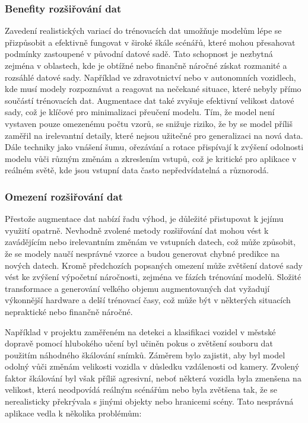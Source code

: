 \documentclass[male,czech,api_ing]{thesis}
\begin{document}
\subsubsection{Benefity rozšiřování dat}
Zavedení realistických variací do trénovacích dat umožňuje modelům lépe se přizpůsobit a efektivně fungovat v široké škále scénářů, které mohou přesahovat podmínky zastoupené v původní datové sadě. Tato schopnost je nezbytná zejména v oblastech, kde je obtížné nebo finančně náročné získat rozmanité a rozsáhlé datové sady. Například ve zdravotnictví nebo v autonomních vozidlech, kde musí modely rozpoznávat a reagovat na nečekané situace, které nebyly přímo součástí trénovacích dat. Augmentace dat také zvyšuje efektivní velikost datové sady, což je klíčové pro minimalizaci přeučení modelu. Tím, že model není vystaven pouze omezenému počtu vzorů, se snižuje riziko, že by se model příliš zaměřil na irelevantní detaily, které nejsou užitečné pro generalizaci na nová data. Dále techniky jako vnášení šumu, ořezávání a rotace přispívají k zvýšení odolnosti modelu vůči různým změnám a zkreslením vstupů, což je kritické pro aplikace v reálném světě, kde jsou vstupní data často nepředvídatelná a různorodá. \cite{AugmentationBasics, AugmentationSurvey}

\subsubsection{Omezení rozšiřování dat}
Přestože augmentace dat nabízí řadu výhod, je důležité přistupovat k jejímu využití opatrně. Nevhodně zvolené metody rozšiřování dat mohou vést k zavádějícím nebo irelevantním změnám ve vstupních datech, což může způsobit, že se modely naučí nesprávné vzorce a budou generovat chybné predikce na nových datech. Kromě předchozích popsaných omezení může zvětšení datové sady vést ke zvýšení výpočetní náročnosti, zejména ve fázích trénování modelů. Složité transformace a generování velkého objemu augmentovaných dat vyžadují výkonnější hardware a delší trénovací časy, což může být v některých situacích nepraktické nebo finančně náročné.

Například v projektu zaměřeném na detekci a klasifikaci vozidel v městské dopravě pomocí hlubokého učení byl učiněn pokus o zvětšení souboru dat použitím náhodného škálování snímků. Záměrem bylo zajistit, aby byl model odolný vůči změnám velikosti vozidla v důsledku vzdálenosti od kamery. Zvolený faktor škálování byl však příliš agresivní, neboť některá vozidla byla zmenšena na velikost, která neodpovídá reálným scénářům nebo byla zvětšena tak, že se nerealisticky překrývala s jinými objekty nebo hranicemi scény. Tato nesprávná aplikace vedla k několika problémům:
\end{document}
